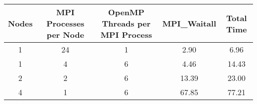 \begin{tabular}{ccccc}
    \toprule
    \textbf{Nodes} & \textbf{MPI Processes per Node} & \textbf{OpenMP Threads per MPI Process} & \textbf{MPI\_Waitall} & \textbf{Total Time} \\
    \midrule
    1 & 24 & 1 & 2.90 & 6.96 \\
    1 & 4 & 6 & 4.46 & 14.43 \\
    2 & 2 & 6 & 13.39 & 23.00 \\
    4 & 1 & 6 & 67.85 & 77.21 \\
    \bottomrule
\end{tabular}
